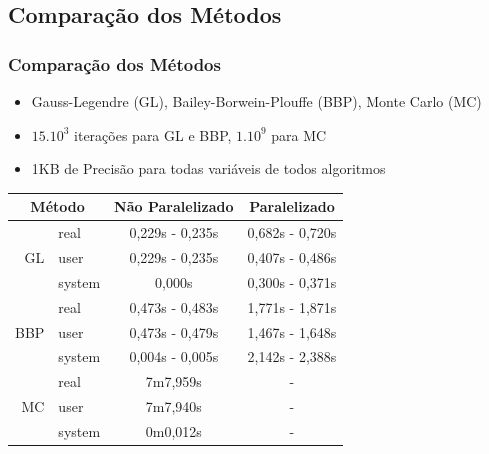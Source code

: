 \documentclass{beamer}
\begin{document}
\begin{frame}

\subsection{Comparação dos Métodos}
\frametitle{Comparação dos Métodos}

\small
\begin{itemize}
    \item Gauss-Legendre (GL), Bailey-Borwein-Plouffe (BBP), Monte Carlo (MC)
    \item $15.10^3$ iterações para GL e BBP, $1.10^9$ para MC
    \item 1KB de Precisão para todas variáveis de todos algoritmos
\end{itemize}

\renewcommand*{\arraystretch}{1.3}
\begin{table}[h]
	\centering
	\begin{tabular}{|r|l|c|c|}
		\hline
		\multicolumn{2}{|c|}{Método}	& Não Paralelizado & Paralelizado \\
		\hline
		\multirow{3}{*}{GL} & real 		& 0,229s - 0,235s	& 0,682s - 0,720s \\
							& user 		& 0,229s - 0,235s	& 0,407s - 0,486s \\
							& system	& 0,000s			& 0,300s - 0,371s \\
		\hline
		\multirow{3}{*}{BBP} & real 	& 0,473s - 0,483s	& 1,771s - 1,871s \\
							& user 		& 0,473s - 0,479s	& 1,467s - 1,648s \\
							& system 	& 0,004s - 0,005s	& 2,142s - 2,388s \\
		\hline
		\multirow{3}{*}{MC} & real 		& 7m7,959s	& - \\
							& user 		& 7m7,940s	& - \\
							& system	& 0m0,012s	& - \\
		\hline
	\end{tabular}
\end{table}
\renewcommand*{\arraystretch}{1}
\normalsize

\end{frame}

\end{document}
